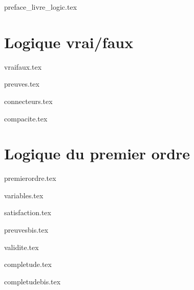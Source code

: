 \documentclass[11pt]{report}
\begin{document}
	

\renewcommand{\contentsname}{Sommaire}

{preface_livre_logic.tex}
\debutchapitres
{}



\clearemptydoublepage



\part{Logique vrai/faux}

{vraifaux.tex}

{preuves.tex}

{connecteurs.tex}

{compacite.tex}



\part{Logique du premier ordre}

{premierordre.tex}

{variables.tex}
	
{satisfaction.tex}

{preuvesbis.tex}

{validite.tex}

{completude.tex}

{completudebis.tex}	


\end{document}
